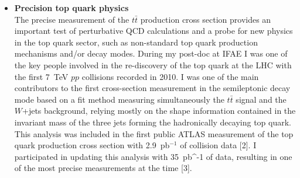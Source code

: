 \documentclass[12pt]{article}
\begin{document}
\begin{itemize}[leftmargin=1.3cm]
\item[] {\bf Precision top quark physics}\\
The precise measurement of the $t\bar{t}$ production cross section provides an important test of perturbative 
QCD calculations and a probe for new physics in the top quark sector, such as non-standard top quark 
production mechanisms and/or decay modes. 
During my post-doc at IFAE I was one of the key people involved in the re-discovery of the top quark at the LHC with the first 
7~TeV $pp$ collisions recorded in 2010. I was one of the main contributors to the first cross-section measurement in the 
semileptonic decay mode based on a fit method measuring simultaneously the $t\bar{t}$ signal and the $W$+jets background,
relying mostly 
on the shape information contained in the invariant mass of the three jets forming the hadronically decaying top quark. 
This analysis was included in the first public ATLAS measurement of the top quark production cross section with 2.9~pb$^{-1}$ of collision data [2].
I participated in updating this analysis with 35~pb^{-1} of data, resulting in one of the most precise measurements at the time [3].
\vspace{2.5mm}


\end{itemize}
\end{document}
